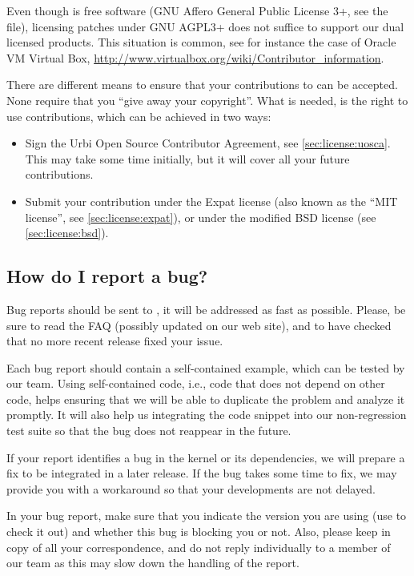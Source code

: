 Even though \usdk is free software (GNU Affero General Public License 3+,
see the  file), licensing patches under GNU AGPL3+ does
not suffice to support our dual licensed products.  This situation is
common, see for instance the case of Oracle VM Virtual Box,
\url{http://www.virtualbox.org/wiki/Contributor_information}.

There are different means to ensure that your contributions to \usdk can be
accepted.  None require that you ``give away your copyright''.  What is
needed, is the right to use contributions, which can be achieved in two
ways:
\begin{itemize}
\item Sign the Urbi Open Source Contributor Agreement, see
  \autoref{sec:license:uosca}.  This may take some time initially, but it
  will cover all your future contributions.
\item Submit your contribution under the Expat license (also known as the
  ``MIT license'', see \autoref{sec:license:expat}), or under the modified
  BSD license (see \autoref{sec:license:bsd}).
\end{itemize}



\subsection{How do I report a bug?}
\label{sec:bug}
Bug reports should be sent to , it will
be addressed as fast as possible.  Please, be sure to read the FAQ (possibly
updated on our web site), and to have checked that no more recent release
fixed your issue.

Each bug report should contain a self-contained example, which can be tested
by our team. Using self-contained code, i.e., code that does not depend on
other code, helps ensuring that we will be able to duplicate the problem and
analyze it promptly. It will also help us integrating the code snippet into
our non-regression test suite so that the bug does not reappear in the
future.

If your report identifies a bug in the \urbi kernel or its dependencies, we
will prepare a fix to be integrated in a later release. If the bug takes
some time to fix, we may provide you with a workaround so that your
developments are not delayed.

In your bug report, make sure that you indicate the \urbi version you are
using (use  to check it out) and whether this bug is
blocking you or not. Also, please keep 
in copy of all your correspondence, and do not reply individually to a
member of our team as this may slow down the handling of the report.

